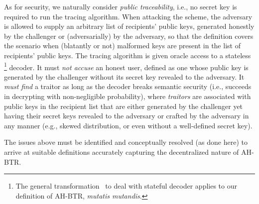 As for security,
we naturally consider \emph{public traceability},
i.e., no secret key is required to run the tracing algorithm.
When attacking the scheme, the adversary is allowed to supply an arbitrary list of recipients' public keys, generated honestly by the challenger or (adversarially) by the adversary, so that the definition covers the scenario when (blatantly or not) malformed keys are present in the list of recipients' public keys.
The tracing algorithm is given oracle access to a stateless%
\footnote{The general transformation~\cite{DRM:KiaYun01,EC:BonSahWat06} to deal with stateful decoder applies to our definition of AH-BTR, \textit{mutatis mutandis}.}
decoder.
It must \emph{not accuse} an honest user, defined as one whose public key is generated by the challenger without its secret key revealed to the adversary.
It \emph{must find} a traitor as long as the decoder breaks semantic security (i.e., succeeds in decrypting with non-negligible probability), where \emph{traitors} are associated with public keys in the recipient list that are either generated by the challenger yet having their secret keys revealed to the adversary or crafted by the adversary in any manner (e.g., skewed distribution, or even without a well-defined secret key).

The issues above must be identified and conceptually resolved (as done here)
to arrive at suitable definitions
accurately capturing the decentralized nature of AH-BTR.
